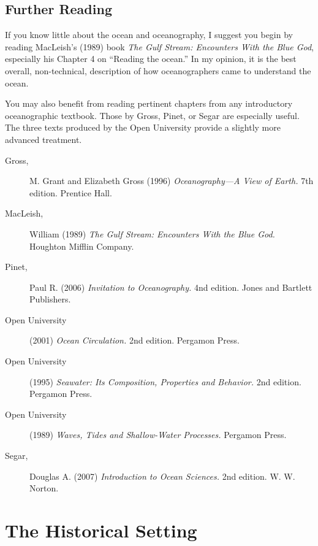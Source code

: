 \section{Further Reading}
If you know little about the ocean and oceanography, I suggest you
begin by reading MacLeish's (1989) book \textit{The Gulf
  Stream: Encounters With the Blue God}, especially
his Chapter 4 on ``Reading the ocean.'' In my opinion, it is the best
overall, non-technical, description of how oceanographers came to
understand the ocean.

You may also benefit from reading pertinent chapters from any
introductory oceanographic textbook. Those by Gross, Pinet, or Segar
are especially useful. The three texts produced by the Open University
provide a slightly more advanced treatment.

\begin{description}
\item[Gross,] M. Grant and Elizabeth Gross (1996)
  \textit{Oceanography---A View of Earth.} 7th edition. Prentice Hall.
\vspace{-0.8ex}
\item[MacLeish,] William (1989) \textit{The Gulf Stream: Encounters
  With the Blue God.} Houghton Mifflin Company.
\vspace{-0.8ex}
\item[Pinet,] Paul R. (2006) \textit{Invitation to Oceanography.} 4nd
  edition. Jones and Bartlett Publishers.
\vspace{-0.8ex}
\item[Open University] (2001) \textit{Ocean Circulation.} 2nd
  edition. Pergamon Press.
\vspace{-0.8ex}
\item[Open University] (1995) \textit{Seawater: Its Composition,
  Properties and Behavior.} 2nd edition. Pergamon Press.
\vspace{-0.8ex}
\item[Open University] (1989) \textit{Waves, Tides and Shallow-Water
  Processes.} Pergamon Press.
\vspace{-0.8ex}
\item[Segar,] Douglas A. (2007) \textit{Introduction to Ocean
  Sciences.} 2nd edition. W. W. Norton.
\end{description}

\chapter{The Historical Setting} 

